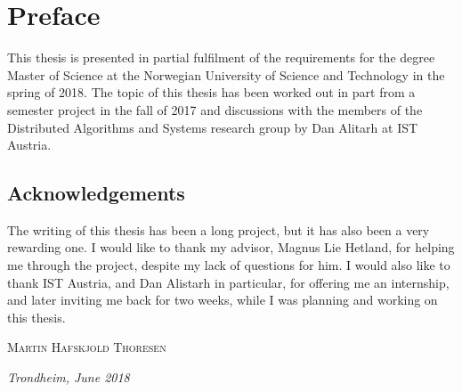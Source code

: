 \par\break\null%
\vsize%
\section*{Preface}

This thesis is presented in partial fulfilment of the requirements for the degree Master of Science
at the Norwegian University of Science and Technology in the spring of 2018. The topic of this
thesis has been worked out in part from a semester project in the fall of 2017 and discussions with
the members of the Distributed Algorithms and Systems research group by Dan Alitarh at IST Austria.


\subsection*{Acknowledgements}

The writing of this thesis has been a long project, but it has also been a very rewarding one.  I
would like to thank my advisor, Magnus Lie Hetland, for helping me through the project, despite my
lack of questions for him.  I would also like to thank IST Austria, and Dan Alistarh in particular,
for offering me an internship, and later inviting me back for two weeks, while I was planning and
working on this thesis.

\vfill
\hfill \textsc{Martin Hafskjold Thoresen}

\hfill \textit{Trondheim, June 2018}
\vfill

